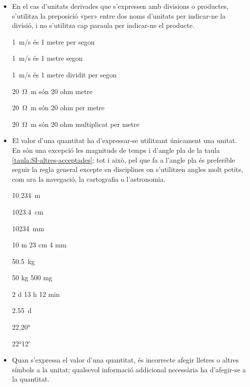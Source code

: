\begin{itemize}
\textcolor{Green}\faCheckSquare{} \qty{12}{GHz} són 12 gigahertz

\textcolor{Red}\faTimesCircle{} \qty{12}{GHz}  són 12 Gigahertz


\item En el cas  d'unitats derivades que s'expressen amb divisions o
productes, s'utilitza la preposició «per» entre dos noms d'unitats
per indicar-ne la divisió, i no s'utilitza cap paraula per indicar-ne el
producte.

\textcolor{Green}\faCheckSquare{} \qty{1}{m/s} és 1 metre per segon

\textcolor{Red}\faTimesCircle{}  \qty{1}{m/s} és 1 metre segon

\textcolor{Red}\faTimesCircle{}  \qty{1}{m/s} és 1 metre dividit per segon

 \textcolor{Green}\faCheckSquare{} \qty{20}{\ohm.m} són 20 ohm metre

\textcolor{Red}\faTimesCircle{}   \qty{20}{\ohm.m} són 20 ohm  per metre

\textcolor{Red}\faTimesCircle{}   \qty{20}{\ohm.m} són 20 ohm multiplicat per metre


\item El valor d'una quantitat ha d'expressar-se  utilitzant únicament una unitat. En són una excepció les magnituds de temps i d'angle pla de la taula \vref{taula:SI-altres-acceptades}; tot i això, pel que fa a l'angle pla és preferible seguir la regla general excepte en disciplines on s'utilitzen angles molt petits, com ara la navegació, la cartografia o l'astronomia.

\textcolor{Green}\faCheckSquare{} \qty{10,234}{m}

\textcolor{Green}\faCheckSquare{} \qty{1023,4}{cm}

\textcolor{Green}\faCheckSquare{} \qty{10234}{mm}

\textcolor{Red}\faTimesCircle{}  10 m 23 cm 4 mm

\textcolor{Green}\faCheckSquare{} \qty{50,5}{kg}

\textcolor{Red}\faTimesCircle{}  50 kg 500 mg

\textcolor{Green}\faCheckSquare{} 2 d 13 h 12 min

\textcolor{Red}\faTimesCircle{}   \qty{2,55}{d}

\textcolor{Green}\faCheckSquare{} \ang{22,20}

\textcolor{Blue}\faExclamationTriangle{} \ang{22;12}


\item Quan s'expressa el valor d'una quantitat, és incorrecte afegir
lletres o altres símbols a la unitat; qualsevol informació
addicional necessària ha d'afegir-se a la quantitat.


\end{itemize}
